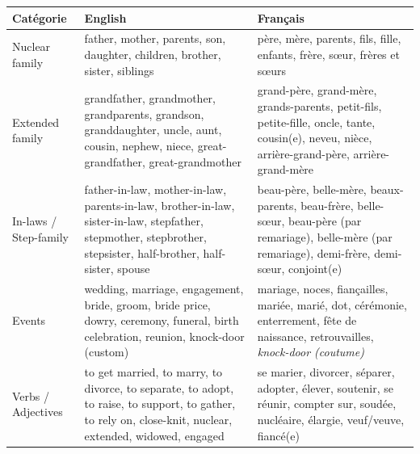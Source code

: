 \documentclass[11pt]{article}
\newcommand{\eng}[1]{\ifmmode\text{\textit{#1}}\else\begingroup\selectlanguage{english}\itshape #1\endgroup\fi}
\begin{document}
\begin{aretenir}
\begin{center}
\begin{tabularx}{\linewidth}{|X|X|X|}
\hline
\rowcolor{popblueL} \textbf{Catégorie} & \textbf{English} & \textbf{Français} \\
\hline
Nuclear family & father, mother, parents, son, daughter, children, brother, sister, siblings & père, mère, parents, fils, fille, enfants, frère, sœur, frères et sœurs \\
\hline
Extended family & grandfather, grandmother, grandparents, grandson, granddaughter, uncle, aunt, cousin, nephew, niece, great-grandfather, great-grandmother & grand-père, grand-mère, grands-parents, petit-fils, petite-fille, oncle, tante, cousin(e), neveu, nièce, arrière-grand-père, arrière-grand-mère \\
\hline
In-laws / Step-family & father-in-law, mother-in-law, parents-in-law, brother-in-law, sister-in-law, stepfather, stepmother, stepbrother, stepsister, half-brother, half-sister, spouse & beau-père, belle-mère, beaux-parents, beau-frère, belle-sœur, beau-père (par remariage), belle-mère (par remariage), demi-frère, demi-sœur, conjoint(e) \\
\hline
Events & wedding, marriage, engagement, bride, groom, bride price, dowry, ceremony, funeral, birth celebration, reunion, knock-door (custom) & mariage, noces, fiançailles, mariée, marié, dot, cérémonie, enterrement, fête de naissance, retrouvailles, \eng{knock-door} (coutume) \\
\hline
Verbs / Adjectives & to get married, to marry, to divorce, to separate, to adopt, to raise, to support, to gather, to rely on, close-knit, nuclear, extended, widowed, engaged & se marier, divorcer, séparer, adopter, élever, soutenir, se réunir, compter sur, soudée, nucléaire, élargie, veuf/veuve, fiancé(e) \\
\hline
\end{tabularx}
\end{center}
\end{aretenir}
\end{document}
